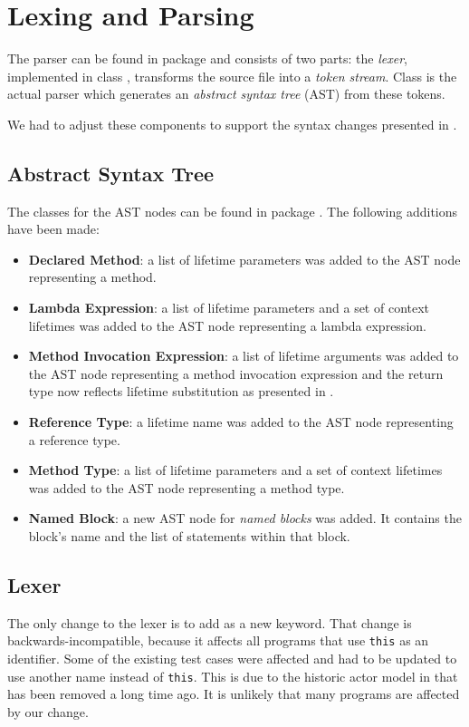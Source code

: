 \section{Lexing and Parsing}\label{section:parser}

The \whiley parser can be found in package  and consists of two parts:
the \emph{lexer}, implemented in class , transforms the source file into a \emph{token stream}.
Class  is the actual parser which generates an \emph{abstract syntax tree} (AST) from these tokens.

We had to adjust these components to support the syntax changes presented in .


\subsection{Abstract Syntax Tree}
The \java classes for the AST nodes can be found in package .
The following additions have been made:
\begin{itemize}
\item \textbf{Declared Method}: a list of lifetime parameters was added to the AST node representing a method.
\item \textbf{Lambda Expression}: a list of lifetime parameters and a set of context lifetimes was added to the AST node representing a lambda expression.
\item \textbf{Method Invocation Expression}: a list of lifetime arguments was added to the AST node representing a method invocation expression and the return type now reflects lifetime substitution as presented in .
\item \textbf{Reference Type}: a lifetime name was added to the AST node representing a reference type.
\item \textbf{Method Type}: a list of lifetime parameters and a set of context lifetimes was added to the AST node representing a method type.
\item \textbf{Named Block}: a new AST node for \emph{named blocks} was added. It contains the block's name and the list of statements within that block.
\end{itemize}


\subsection{Lexer}
The only change to the lexer is to add  as a new keyword.
That change is backwards-incompatible, because it affects all programs that use \texttt{this} as an identifier.
Some of the existing test cases were affected and had to be updated to use another name instead of \texttt{this}.
This is due to the historic actor model in \whiley that has been removed a long time ago.
It is unlikely that many programs are affected by our change.


